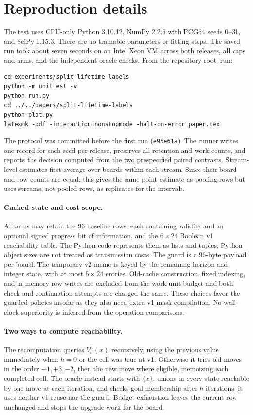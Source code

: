 \section{Reproduction details}
\label{app:details}

The test uses CPU-only Python 3.10.12, NumPy 2.2.6 with PCG64 seeds 0--31,
and SciPy 1.15.3. There are no trainable parameters or fitting steps.
The saved run took about seven seconds on an Intel Xeon VM across both
releases, all caps and arms, and the independent oracle checks.
From the repository root, run:
\begin{verbatim}
cd experiments/split-lifetime-labels
python -m unittest -v
python run.py
cd ../../papers/split-lifetime-labels
python plot.py
latexmk -pdf -interaction=nonstopmode -halt-on-error paper.tex
\end{verbatim}
The protocol was committed before the first run
(\href{https://github.com/manojbajaj95/cl/commit/e95e61a}{\texttt{e95e61a}}).
The runner writes one record for each seed per release, preserves all
retention and work counts, and reports the decision computed from the
two prespecified paired contrasts. Stream-level estimates first average
over boards within each stream. Since their board and row counts are
equal, this gives the same point estimate as pooling rows but uses
streams, not pooled rows, as replicates for the intervals.

\paragraph{Cached state and cost scope.}
All arms may retain the 96 baseline rows, each containing validity and
an optional signed progress bit of information, and the $6\times24$
Boolean v1 reachability table. The Python code represents them as
lists and tuples; Python object sizes are not treated as transmission
costs. The guard is a 96-byte payload per board. The temporary v2
memo is keyed by the remaining horizon and integer state, with at most
$5\times24$ entries. Old-cache construction, fixed indexing, and
in-memory row writes are excluded from the work-unit budget and both
check and continuation attempts are charged the same. These choices
favor the guarded policies insofar as they also need extra v1 mask
compilation. No wall-clock superiority is
inferred from the operation comparisons.

\paragraph{Two ways to compute reachability.}
The recomputation queries $V_v^h(x)$ recursively, using the previous
value immediately when $h=0$ or the cell was true at v1. Otherwise it
tries old moves in the order $+1,+3,-2$, then the new move where
eligible, memoizing each completed cell. The oracle instead starts
with $\{x\}$, unions in every state reachable by one move at each
iteration, and checks goal membership after $h$ iterations; it uses
neither v1 reuse nor the guard. Budget exhaustion leaves the current
row unchanged and stops the upgrade work for the board.
